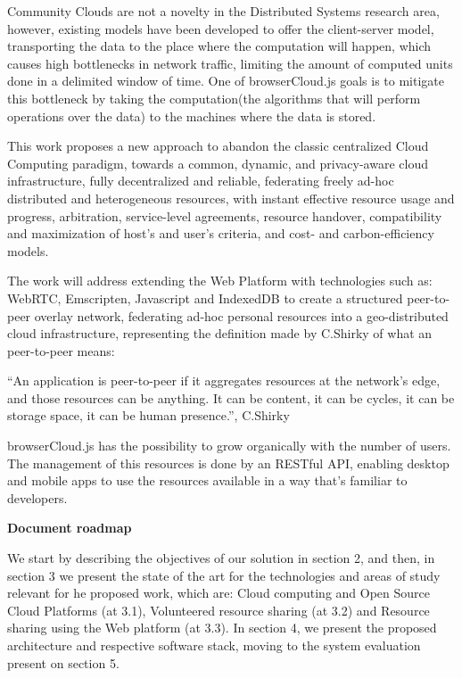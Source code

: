 Community Clouds are not a novelty in the Distributed Systems research area, however, existing models have been developed to offer the client-server model, transporting the data to the place where the computation will happen, which causes high bottlenecks in network traffic, limiting the amount of computed units done in a delimited window of time. One of browserCloud.js goals is to mitigate this bottleneck by taking the computation(the algorithms that will perform operations over the data) to the machines where the data is stored.

This work proposes a new approach to abandon the classic centralized Cloud Computing paradigm, towards a common, dynamic, and privacy-aware cloud infrastructure, fully decentralized and reliable, federating freely ad-hoc distributed and heterogeneous resources, with instant effective resource usage and progress, arbitration, service-level agreements, resource handover, compatibility and maximization of host's and user's criteria, and cost- and carbon-efficiency models.

The work will address extending the Web Platform with technologies such as: WebRTC, Emscripten, Javascript and IndexedDB to create a structured peer-to-peer overlay network, federating ad-hoc personal resources into a geo-distributed cloud infrastructure, representing the definition made by C.Shirky of what an peer-to-peer means:

  ``An application is peer-to-peer if it aggregates resources at the network’s edge, and those resources can be anything. It can be content, it can be cycles, it can be storage space, it can be human presence.'', C.Shirky \cite{Shirky.}

browserCloud.js has the possibility to grow organically with the number of users. The management of this resources is done by an RESTful API, enabling desktop and mobile apps to use the resources available in a way that's familiar to developers. 


\textbf{Document roadmap}

We start by describing the objectives of our solution in section 2, and then, in section 3 we present the state of the art for the technologies and areas of study relevant for he proposed work, which are: Cloud computing and Open Source Cloud Platforms (at 3.1), Volunteered resource sharing (at 3.2) and Resource sharing using the Web platform (at 3.3). In section 4, we present the proposed architecture and respective software stack, moving to the system evaluation present on section 5.